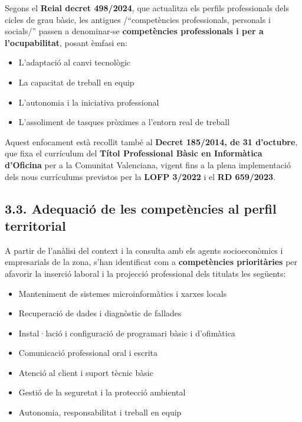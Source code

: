 \documentclass[
  paper=a4,
  ,captions=tableheading
]{scrartcl}
\providecommand{\tightlist}{%
  \setlength{\itemsep}{0pt}\setlength{\parskip}{0pt}}
\begin{document}
Segons el \textbf{Reial decret 498/2024}, que actualitza els perfils
professionals dels cicles de grau bàsic, les antigues /``competències
professionals, personals i socials/'' passen a denominar-se
\textbf{competències professionals i per a l'ocupabilitat}, posant
èmfasi en:

\begin{itemize}
\tightlist
\item
  L'adaptació al canvi tecnològic
\item
  La capacitat de treball en equip
\item
  L'autonomia i la iniciativa professional
\item
  L'assoliment de tasques pròximes a l'entorn real de treball
\end{itemize}

Aquest enfocament està recollit també al \textbf{Decret 185/2014, de 31
d'octubre}, que fixa el currículum del \textbf{Títol Professional Bàsic
en Informàtica d'Oficina} per a la Comunitat Valenciana, vigent fins a
la plena implementació dels nous currículums previstos per la
\textbf{LOFP 3/2022} i el \textbf{RD 659/2023}.

\hypertarget{adequaciuxf3-de-les-competuxe8ncies-al-perfil-territorial}{%
\subsection{3.3. Adequació de les competències al perfil
territorial}\label{adequaciuxf3-de-les-competuxe8ncies-al-perfil-territorial}}

A partir de l'anàlisi del context i la consulta amb els agents
socioeconòmics i empresarials de la zona, s'han identificat com a
\textbf{competències prioritàries} per afavorir la inserció laboral i la
projecció professional dels titulats les següents:

\begin{itemize}
\tightlist
\item
  Manteniment de sistemes microinformàtics i xarxes locals
\item
  Recuperació de dades i diagnòstic de fallades
\item
  Instal·lació i configuració de programari bàsic i d'ofimàtica
\item
  Comunicació professional oral i escrita
\item
  Atenció al client i suport tècnic bàsic
\item
  Gestió de la seguretat i la protecció ambiental
\item
  Autonomia, responsabilitat i treball en equip
\end{itemize}
\end{document}
